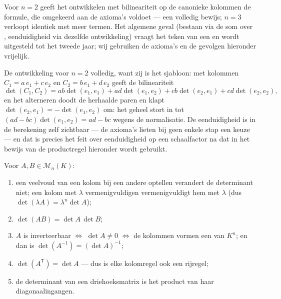 \begin{remark}
Voor $n = 2$ geeft het ontwikkelen met bilineariteit op de
canonieke kolommen de formule, die omgekeerd aan de axioma's
voldoet --- een volledig bewijs; $n = 3$ verloopt identiek met meer
termen. Het algemene geval (bestaan via de som over ,
eenduidigheid via dezelfde ontwikkeling) vraagt het teken van een
 en wordt uitgesteld tot het tweede jaar; wij gebruiken
de axioma's en de gevolgen hieronder vrijelijk.

De ontwikkeling voor $n = 2$ volledig, want zij is het sjabloon:
met kolommen $C_1 = a\,e_1 + c\,e_2$ en $C_2 = b\,e_1 + d\,e_2$
geeft de bilineariteit
\[
\det(C_1, C_2) = ab\det(e_1, e_1) + ad\det(e_1, e_2)
+ cb\det(e_2, e_1) + cd\det(e_2, e_2),
\]
en het alterneren doodt de herhaalde paren en klapt $\det(e_2,
e_1) = -\det(e_1, e_2)$ om: het geheel stort in tot $(ad -
bc)\det(e_1, e_2) = ad - bc$ wegens de normalisatie. De
eenduidigheid is in de berekening zelf zichtbaar --- de axioma's
lieten bij geen enkele stap een keuze --- en dat is precies het
feit over eenduidigheid op een schaalfactor na dat in het bewijs
van de productregel hieronder wordt gebruikt.
\end{remark}

\begin{theorem}[Eigenschappen]\label{thm:b1:det:props}
Voor $A, B \in \mathcal{M}_n(K)$:
\begin{enumerate}
  \item een veelvoud van een kolom bij een andere optellen verandert
        de determinant niet; een kolom met $\lambda$
        vermenigvuldigen vermenigvuldigt hem met $\lambda$ (dus
        $\det(\lambda A) = \lambda^n \det A$);
  \item $\det(AB) = \det A\, \det B$;
  \item $A$ is inverteerbaar $\iff$ $\det A \neq 0$ $\iff$ de
        kolommen vormen een  van $K^n$; en dan is $\det(A^{-1})
        = (\det A)^{-1}$;
  \item $\det(A^{\mathsf T}) = \det A$ --- dus is elke kolomregel
        ook een rijregel;
  \item de determinant van een driehoeksmatrix is het product van
        haar diagonaalingangen.
\end{enumerate}
\end{theorem}

